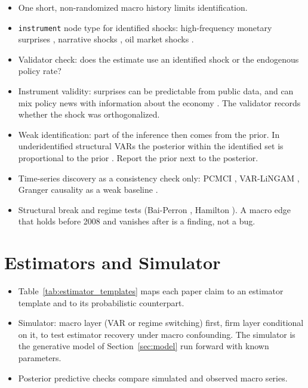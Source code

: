   \begin{itemize}
  \tightlist
  \item
    One short, non-randomized macro history limits identification.
  \item
    \texttt{instrument} node type for identified shocks: high-frequency
    monetary surprises \cite{gertler2015monetary,nakamura2018high}, narrative
    shocks \cite{romer2004new}, oil market shocks \cite{kilian2009oil}.
  \item
    Validator check: does the estimate use an identified shock or the
    endogenous policy rate?
  \item
    Instrument validity: surprises can be predictable from public data, and
    can mix policy news with information about the economy
    \cite{bauer2023reassessment,miranda2021transmission}. The validator
    records whether the shock was orthogonalized.
  \item
    Weak identification: part of the inference then comes from the prior. In
    underidentified structural VARs the posterior within the identified set is
    proportional to the prior \cite{baumeister2015sign}. Report the prior
    next to the posterior.
  \item
    Time-series discovery as a consistency check only: PCMCI
    \cite{runge2019pcmci}, VAR-LiNGAM \cite{hyvarinen2010var}, Granger
    causality as a weak baseline \cite{granger1969investigating}.
  \item
    Structural break and regime tests (Bai-Perron \cite{bai1998estimating},
    Hamilton \cite{hamilton1989new}). A macro edge that holds before 2008
    and vanishes after is a finding, not a bug.
  \end{itemize}

  \section{Estimators and Simulator}\label{sec:estimators}

  \begin{itemize}
  \tightlist
  \item
    Table~\ref{tab:estimator_templates} maps each paper claim to an
    estimator template and to its probabilistic counterpart.
  \item
    Simulator: macro layer (VAR or regime switching) first, firm layer
    conditional on it, to test estimator recovery under macro confounding.
    The simulator is the generative model of Section~\ref{sec:model} run
    forward with known parameters.
  \item
    Posterior predictive checks compare simulated and observed macro
    series.
  \end{itemize}

